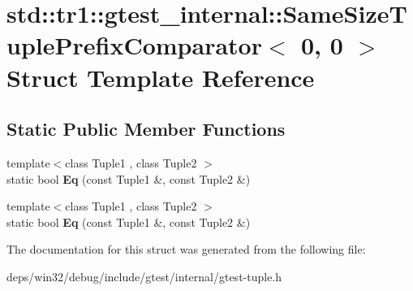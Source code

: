 \hypertarget{structstd_1_1tr1_1_1gtest__internal_1_1_same_size_tuple_prefix_comparator_3_010_00_010_01_4}{}\section{std\+:\+:tr1\+:\+:gtest\+\_\+internal\+:\+:Same\+Size\+Tuple\+Prefix\+Comparator$<$ 0, 0 $>$ Struct Template Reference}
\label{structstd_1_1tr1_1_1gtest__internal_1_1_same_size_tuple_prefix_comparator_3_010_00_010_01_4}
\subsection*{Static Public Member Functions}
\begin{DoxyCompactItemize}
\item 
\hypertarget{structstd_1_1tr1_1_1gtest__internal_1_1_same_size_tuple_prefix_comparator_3_010_00_010_01_4_a4f209822266c6bb1832c49750a11ef95}{}{\footnotesize template$<$class Tuple1 , class Tuple2 $>$ }\\static bool {\bfseries Eq} (const Tuple1 \&, const Tuple2 \&)\label{structstd_1_1tr1_1_1gtest__internal_1_1_same_size_tuple_prefix_comparator_3_010_00_010_01_4_a4f209822266c6bb1832c49750a11ef95}

\item 
\hypertarget{structstd_1_1tr1_1_1gtest__internal_1_1_same_size_tuple_prefix_comparator_3_010_00_010_01_4_a4f209822266c6bb1832c49750a11ef95}{}{\footnotesize template$<$class Tuple1 , class Tuple2 $>$ }\\static bool {\bfseries Eq} (const Tuple1 \&, const Tuple2 \&)\label{structstd_1_1tr1_1_1gtest__internal_1_1_same_size_tuple_prefix_comparator_3_010_00_010_01_4_a4f209822266c6bb1832c49750a11ef95}

\end{DoxyCompactItemize}


The documentation for this struct was generated from the following file\+:\begin{DoxyCompactItemize}
\item 
deps/win32/debug/include/gtest/internal/gtest-\/tuple.\+h\end{DoxyCompactItemize}
